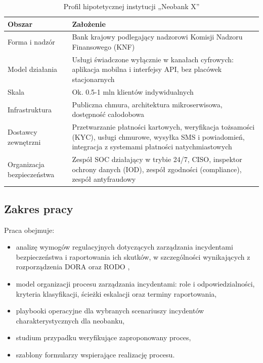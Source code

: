\begin{table}[H]
\centering
\caption{Profil hipotetycznej instytucji „Neobank X”}
\label{tab:profil}
\begin{tabular}{@{}p{4.2cm}p{9.3cm}@{}}
\toprule
\textbf{Obszar} & \textbf{Założenie} \\
\midrule
Forma i nadzór &
Bank krajowy podlegający nadzorowi Komisji Nadzoru Finansowego (KNF) \\
Model działania &
Usługi świadczone wyłącznie w kanałach cyfrowych: aplikacja mobilna i interfejsy API, bez placówek stacjonarnych \\
Skala &
Ok. 0.5-1 mln klientów indywidualnych \\
Infrastruktura &
Publiczna chmura, architektura mikroserwisowa, dostępność całodobowa \\
Dostawcy zewnętrzni &
Przetwarzanie płatności kartowych, weryfikacja tożsamości (KYC), usługi chmurowe, wysyłka SMS i powiadomień, integracja z systemami płatności natychmiastowych \\
Organizacja bezpieczeństwa &
Zespół SOC działający w trybie 24/7, CISO, inspektor ochrony danych (IOD), zespół zgodności (compliance), zespół antyfraudowy \\
\bottomrule
\end{tabular}
\end{table}

\subsection{Zakres pracy}

Praca obejmuje:
\begin{itemize}
    \item analizę wymogów regulacyjnych dotyczących zarządzania incydentami bezpieczeństwa i raportowania ich skutków, w szczególności wynikających z rozporządzenia DORA \cite{dora2022} oraz RODO \cite{rodo2016},
    \item model organizacji procesu zarządzania incydentami: role i odpowiedzialności, kryteria klasyfikacji, ścieżki eskalacji oraz terminy raportowania,
    \item playbooki operacyjne dla wybranych scenariuszy incydentów charakterystycznych dla neobanku,
    \item studium przypadku weryfikujące zaproponowany proces,
    \item szablony formularzy wspierające realizację procesu.
\end{itemize}

